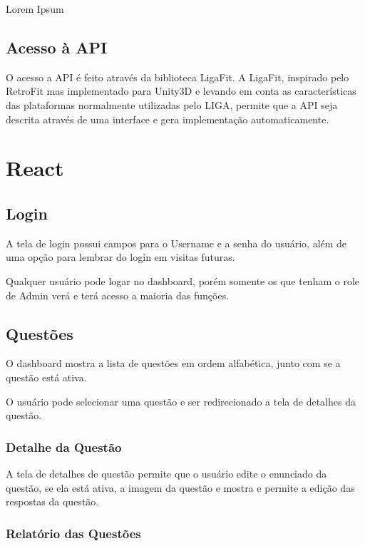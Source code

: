 Lorem Ipsum


\subsection{Acesso à API}
\label{subsec:acessoapi}

O acesso a API é feito através da biblioteca LigaFit. A LigaFit, inspirado pelo RetroFit mas implementado para Unity3D e levando em conta as características das plataformas normalmente utilizadas pelo LIGA, permite que a API seja descrita através de uma interface e gera implementação automaticamente.


\section{React}
\label{sec:react}


\subsection{Login}
\label{subsec:loginreact}

A tela de login possui campos para o Username e a senha do usuário, além de uma opção para lembrar do login em visitas futuras.

Qualquer usuário pode logar no dashboard, porém somente os que tenham o role de Admin verá e terá acesso a maioria das funções.


\subsection{Questões}
\label{subsec:questoesreact}

O dashboard mostra a lista de questões em ordem alfabética, junto com se a questão está ativa.
    
O usuário pode selecionar uma questão e ser redirecionado a tela de detalhes da questão.


\subsubsection{Detalhe da Questão}
\label{subsubsec:detalhequestao}

A tela de detalhes de questão permite que o usuário edite o enunciado da questão, se ela está ativa, a imagem da questão e mostra e permite a edição das respostas da questão.


\subsubsection{Relatório das Questões}
\label{subsubsec:relatorioquestoes}

